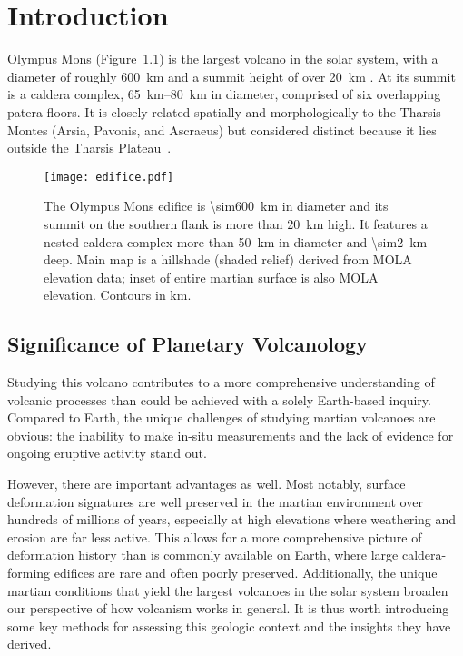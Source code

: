 \chapter{Introduction}

Olympus Mons (Figure~\ref{fig:edifice}) is the largest volcano in the solar system, with a diameter of roughly \qty{600}{\km} and a summit height of over \qty{20}{\km} \parencite[e.g.,][]{plescia_morphometric_2004}. At its summit is a caldera complex, \qtyrange{65}{80}{\km} in diameter, comprised of six overlapping patera floors. It is closely related spatially and morphologically to the Tharsis Montes (Arsia, Pavonis, and Ascraeus) but considered distinct because it lies outside the Tharsis Plateau~\parencite[e.g.,][]{carr_volcanism_1973}.

\begin{figure}
    \centering
    \texttt{[image: edifice.pdf]}
    \caption[Olympus Mons]{The Olympus Mons edifice is \qty{\sim600}{\km} in diameter and its summit on the southern flank is more than \qty{20}{\km} high. It features a nested caldera complex more than \qty{50}{\km} in diameter and \qty{\sim2}{\km} deep. Main map is a hillshade (shaded relief) derived from \acf{MOLA} elevation data\parencite{smith_mars_2001}; inset of entire martian surface is also \acs{MOLA} elevation. Contours in \unit{\km}.}\label{fig:edifice}
\end{figure}

\section{Significance of Planetary Volcanology}

Studying this volcano contributes to a more comprehensive understanding of volcanic processes than could be achieved with a solely Earth-based inquiry. Compared to Earth, the unique challenges of studying martian volcanoes are obvious: the inability to make in-situ measurements and the lack of evidence for ongoing eruptive activity stand out. 

However, there are important advantages as well. Most notably, surface deformation signatures are well preserved in the martian environment over hundreds of millions of years, especially at high elevations where weathering and erosion are far less active. This allows for a more comprehensive picture of deformation history than is commonly available on Earth, where large caldera-forming edifices are rare and often poorly preserved. Additionally, the unique martian conditions that yield the largest volcanoes in the solar system broaden our perspective of how volcanism works in general. It is thus worth introducing some key methods for assessing this geologic context and the insights they have derived.

